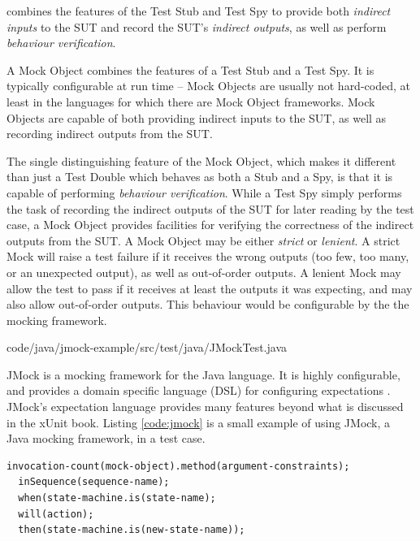  combines the features of the Test Stub and
Test Spy to provide both \textit{indirect inputs} to the SUT and
record the SUT's \textit{indirect outputs}, as well as perform
\textit{behaviour verification}.

A Mock Object combines the features of a Test Stub and a Test Spy. It
is typically configurable at run time -- Mock Objects are usually not
hard-coded, at least in the languages for which there are Mock Object
frameworks. Mock Objects are capable of both providing indirect inputs
to the SUT, as well as recording indirect outputs from the SUT.

The single distinguishing feature of the Mock Object, which makes it
different than just a Test Double which behaves as both a Stub and a
Spy, is that it is capable of performing \textit{behaviour
  verification}. While a Test Spy simply performs the task of recording
the indirect outputs of the SUT for later reading by the test case, a
Mock Object provides facilities for verifying the correctness of the
indirect outputs from the SUT. A Mock Object may be either
\textit{strict} or \textit{lenient}. A strict Mock will raise a test
failure if it receives the wrong outputs (too few, too many, or an
unexpected output), as well as out-of-order outputs. A lenient Mock
may allow the test to pass if it receives at least the outputs it was
expecting, and may also allow out-of-order outputs. This behaviour
would be configurable by the the mocking framework.

 {code/java/jmock-example/src/test/java/JMockTest.java}

JMock is a mocking framework for the Java language. It is highly
configurable, and provides a domain specific language (DSL) for
configuring expectations \cite{freeman:evolving}. JMock's
expectation language provides many features beyond what is discussed
in the xUnit book. Listing \ref{code:jmock} is a small example of
using JMock, a Java mocking framework, in a test case.

\footnotesize
\begin{verbatim}
invocation-count(mock-object).method(argument-constraints);
  inSequence(sequence-name);
  when(state-machine.is(state-name);
  will(action);
  then(state-machine.is(new-state-name));
\end{verbatim}
\normalsize

